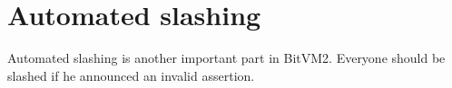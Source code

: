 \section{Automated slashing} \label{sec:automated-slashing}

Automated slashing is another important part in BitVM2. Everyone should be slashed if he announced an invalid assertion.

